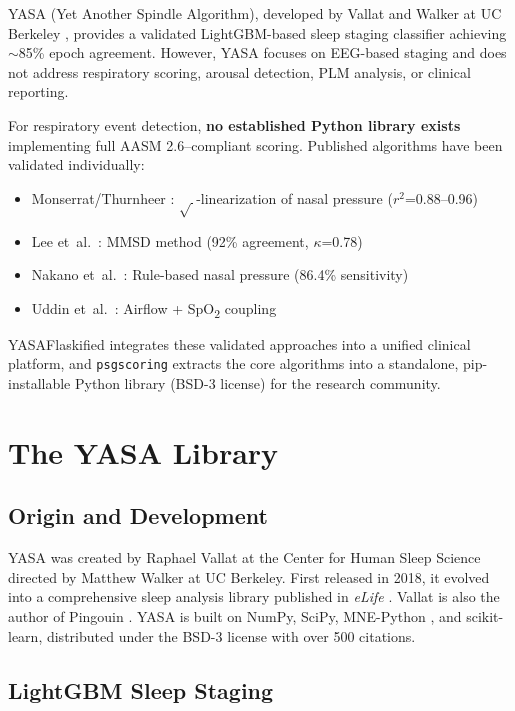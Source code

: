 \documentclass[11pt,a4paper,twocolumn]{article}
\begin{document}
YASA (Yet Another Spindle Algorithm), developed by Vallat and Walker at UC Berkeley \cite{vallat2021}, provides a validated LightGBM-based sleep staging classifier achieving $\sim$85\% epoch agreement. However, YASA focuses on EEG-based staging and does not address respiratory scoring, arousal detection, PLM analysis, or clinical reporting.

For respiratory event detection, \textbf{no established Python library exists} implementing full AASM 2.6--compliant scoring. Published algorithms have been validated individually:

\begin{itemize}[nosep,leftmargin=1.5em]
  \item Monserrat/Thurnheer \cite{monserrat2001,thurnheer2001}: $\sqrt{\,}$-linearization of nasal pressure ($r^2$=0.88--0.96)
  \item Lee et~al.\ \cite{lee2008}: MMSD method (92\% agreement, $\kappa$=0.78)
  \item Nakano et~al.\ \cite{nakano2016}: Rule-based nasal pressure (86.4\% sensitivity)
  \item Uddin et~al.\ \cite{uddin2021}: Airflow + SpO\textsubscript{2} coupling
\end{itemize}

YASAFlaskified integrates these validated approaches into a unified clinical platform, and \texttt{psgscoring} extracts the core algorithms into a standalone, pip-installable Python library (BSD-3 license) for the research community.


\section{The YASA Library}

\subsection{Origin and Development}

YASA was created by Raphael Vallat at the Center for Human Sleep Science directed by Matthew Walker at UC Berkeley. First released in 2018, it evolved into a comprehensive sleep analysis library published in \emph{eLife} \cite{vallat2021}. Vallat is also the author of Pingouin \cite{pingouin}. YASA is built on NumPy, SciPy, MNE-Python \cite{gramfort2014}, and scikit-learn, distributed under the BSD-3 license with over 500 citations.

\subsection{LightGBM Sleep Staging}
\end{document}
